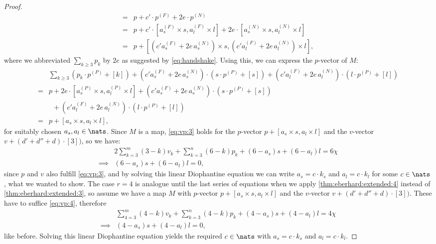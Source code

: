 \begin{proposition}
\begin{proof}
\begin{align*}
      ={}& p + c' \cdot p^{(F)} + 2e \cdot p^{(N)}\\
      ={}& p + c' \cdot \left[a^{(F)}_s \times s, a^{(F)}_l \times l\right] + 2e \cdot \left[a^{(N)}_s \times s, a^{(N)}_l \times l\right]\\
      ={}& p + \left[\left(c' a^{(F)}_s + 2e \, a^{(N)}_s \right) \times s, \left(c' a^{(F)}_l + 2e\, a^{(N)}_l\right) \times l \right],
    \end{align*}
    where we abbreviated $\sum_{k\geq 3}p_k$ by $2e$ as suggested by \autoref{eq:handshake}. Using this, we can express the $p$-vector of $M$:
    \begin{align*}
      &\sum_{k \geq 3} \left(p_k \cdot p^{(P)} + [k] \right) 
        + \left(c' a^{(F)}_s + 2e \, a^{(N)}_s \right) \cdot \left(s \cdot p^{(P)} + [s] \right)
        + \left(c' a^{(F)}_l + 2e \, a^{(N)}_l \right) \cdot \left(l \cdot p^{(P)} + [l] \right)\\
      ={}&p + 2e \cdot \left[a^{(P)}_s \times s, a^{(P)}_l \times l\right] + \left(c' a^{(F)}_s + 2e \, a^{(N)}_s \right) \cdot \left(s \cdot p^{(P)} + [s] \right)\\     
      &\phantom{p}+ \left(c' a^{(F)}_l + 2e \, a^{(N)}_l \right) \cdot \left(l \cdot p^{(P)} + [l] \right)\\
      ={}&p + [a_s \times s, a_l \times l],
    \end{align*}
    for suitably chosen $a_s, a_l \in \nats$. Since $M$ is a map, \autoref{eq:vp:3} holds for the $p$-vector $p + [a_s \times s, a_l \times l]$ and the $v$-vector $v + (d' + d'' + d) \cdot [3])$, so we have:
    \begin{align*}
      &2 \sum_{k=3}^m \left(3 - k \right) v_k + \sum_{k=3}^n \left(6 - k \right) p_k + (6 - a_s) s + (6 - a_l) l = 6 \chi \\
      \implies & (6 - a_s) s + (6 - a_l) l = 0,
    \end{align*}
    since $p$ and $v$ also fulfill \autoref{eq:vp:3}, and by solving this linear Diophantine equation we can write $a_s = c \cdot k_s$ and $a_l = c \cdot k_l$ for some $c \in \nats$, what we wanted to show. The case $r = 4$ is analogue until the last series of equations when we apply \autoref{thm:eberhard:extended:4} instead of \autoref{thm:eberhard:extended:3}, so assume we have a map $M$ with $p$-vector $p + [a_s \times s, a_l \times l]$ and the $v$-vector $v + (d' + d'' + d) \cdot [3])$. These have to suffice  \autoref{eq:vp:4}, therefore
    \begin{align*}
      &\sum_{4=3}^m \left(4 - k \right) v_k +  \sum_{k=3}^n \left(4 - k \right) p_k + (4 - a_s) s + (4 - a_l) l = 4 \chi\\
      \implies & (4 - a_s) s + (4 - a_l) l = 0,
    \end{align*}
    like before. Solving this linear Diophantine equation yields the required $c \in \nats$ with $a_s = c \cdot k_s$ and $a_l = c \cdot k_l$.
  \end{proof}
\end{proposition}

